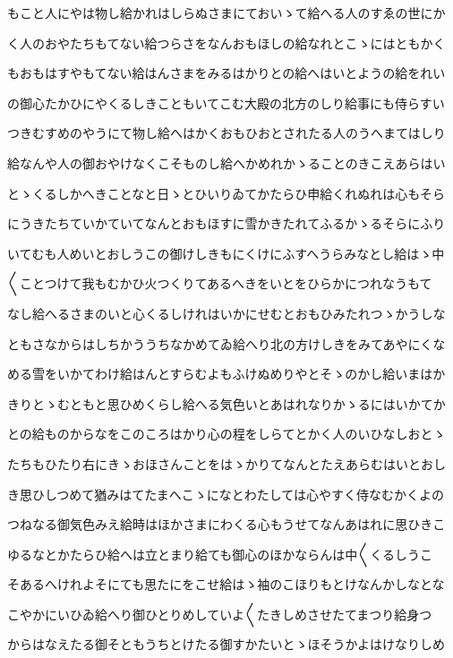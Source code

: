 \documentclass[a4paper,11pt,landscape]{ltjtarticle}
\begin{document}
もこと人にやは物し給かれはしらぬさまにておいゝて給へる人のすゑの世にか
\par\medskip
く人のおやたちもてない給つらさをなんおもほしの給なれとこゝにはともかく
\par\medskip
もおもはすやもてない給はんさまをみるはかりとの給へはいとようの給をれい
\par\medskip
の御心たかひにやくるしきこともいてこむ大殿の北方のしり給事にも侍らすい
\par\medskip
つきむすめのやうにて物し給へはかくおもひおとされたる人のうへまてはしり
\par\medskip
給なんや人の御おやけなくこそものし給へかめれかゝることのきこえあらはい
\par\medskip
とゝくるしかへきことなと日ゝとひいりゐてかたらひ申給くれぬれは心もそら
\par\medskip
にうきたちていかていてなんとおもほすに雪かきたれてふるかゝるそらにふり
\par\medskip
いてむも人めいとおしうこの御けしきもにくけにふすへうらみなとし給はゝ中
\par\medskip
〱ことつけて我もむかひ火つくりてあるへきをいとをひらかにつれなうもて
\par\medskip
なし給へるさまのいと心くるしけれはいかにせむとおもひみたれつゝかうしな
\par\medskip
ともさなからはしちかううちなかめてゐ給へり北の方けしきをみてあやにくな
\par\medskip
める雪をいかてわけ給はんとすらむよもふけぬめりやとそゝのかし給いまはか
\par\medskip
きりとゝむともと思ひめくらし給へる気色いとあはれなりかゝるにはいかてか
\par\medskip
との給ものからなをこのころはかり心の程をしらてとかく人のいひなしおとゝ
\par\medskip
たちもひたり右にきゝおほさんことをはゝかりてなんとたえあらむはいとおし
\par\medskip
き思ひしつめて猶みはてたまへこゝになとわたしては心やすく侍なむかくよの
\par\medskip
つねなる御気色みえ給時はほかさまにわくる心もうせてなんあはれに思ひきこ
\par\medskip
ゆるなとかたらひ給へは立とまり給ても御心のほかならんは中〱くるしうこ
\par\medskip
そあるへけれよそにても思たにをこせ給はゝ袖のこほりもとけなんかしなとな
\par\medskip
こやかにいひゐ給へり御ひとりめしていよ〱たきしめさせたてまつり給身つ
\par\medskip
からはなえたる御そともうちとけたる御すかたいとゝほそうかよはけなりしめ
\end{document}
